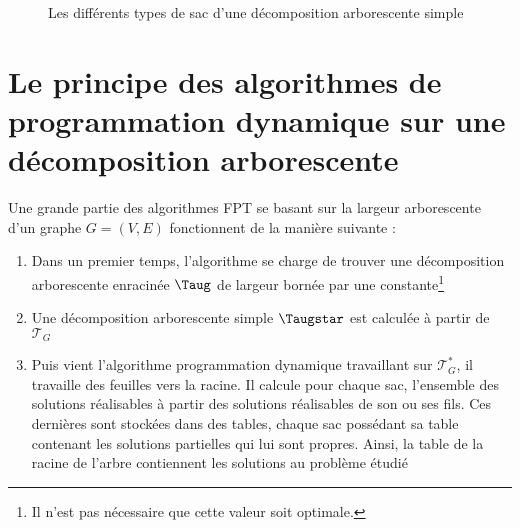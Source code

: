 \begin{figure}
    \begin{center}
        \hfill
        \subfloat[Feuille]{\label{fig:feuille}
            \begin{tikzpicture}
                
            \end{tikzpicture}
        }
        \hfill
        \subfloat[Ajout]{\label{fig:ajout}
            \begin{tikzpicture}
                
            \end{tikzpicture}
        }
        \hfill
        \subfloat[Suppression]{\label{fig:suppression}
            \begin{tikzpicture}
                
            \end{tikzpicture}
        }
        \hfill
        \subfloat[Fusion]{\label{fig:fusion}
            \begin{tikzpicture}
                
            \end{tikzpicture}
        }
        \hfill
        \caption{Les différents types de sac d'une décomposition arborescente simple}
        \label{type_sac}
    \end{center}
\end{figure}
        


\section{Le principe des algorithmes de programmation dynamique sur une décomposition arborescente}
\label{pd_scheme}

Une grande partie des algorithmes FPT se basant sur la largeur arborescente d'un graphe $G = (V, E)$
fonctionnent de la manière suivante :
\begin{enumerate}
    \item Dans un premier temps, l'algorithme se charge de trouver une décomposition arborescente
        enracinée $\Taug$ de largeur bornée par une constante\footnote{Il n'est pas nécessaire que
        cette valeur soit optimale.}
    \item Une décomposition arborescente simple $\Taugstar$ est calculée à partir de $\mathcal{T}_G$
    \item Puis vient l'algorithme programmation dynamique travaillant sur $\mathcal{T}_G^*$, il
        travaille des feuilles vers la racine. Il calcule pour chaque sac, l'ensemble des solutions
        réalisables à partir des solutions réalisables de son ou ses fils. Ces dernières sont
        stockées dans des tables, chaque sac possédant sa table contenant les solutions partielles
        qui lui sont propres.  Ainsi, la table de la racine de l'arbre contiennent
        les solutions au problème étudié
\end{enumerate}

